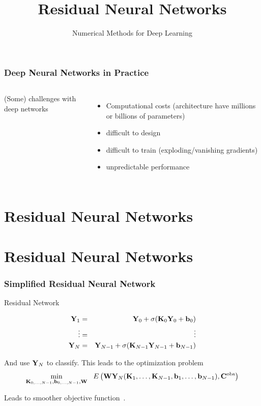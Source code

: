 \documentclass[12pt,fleqn,beamer]{beamer}
\date{}
\title[ResNet]{Residual Neural Networks}
\subtitle{Numerical Methods for Deep Learning}
\begin{document}
\makebeamertitle

\begin{frame}[fragile]\frametitle{Deep Neural Networks in Practice}

\begin{columns}
(Some) challenges with deep networks
\begin{itemize}
\item
Computational costs (architecture have millions or billions of parameters)
\item
difficult to design
\item
difficult to train (exploding/vanishing gradients)
\item
unpredictable performance
\end{itemize}

\bigskip
{}
	
\end{columns}


\end{frame}





\section{Residual Neural Networks} %
\label{sec:residual_neural_networks}

\section{Residual Neural Networks} %
\label{sec:residual_neural_networks}

\begin{frame}[fragile]\frametitle{Simplified Residual Neural Network}

Residual Network

\bigskip

\begin{eqnarray*}
{\bf Y}_1 &=& {\bf Y}_0 + \sigma({\bf K}_0{\bf Y}_0 + {\bf b}_0) \\
\vdots &=&  \vdots \\
 {\bf Y}_N &=& {\bf Y}_{N-1} + \sigma( {\bf K}_{N-1}{\bf Y}_{N-1} + {\bf b}_{N-1})
 \end{eqnarray*}

And use ${\bf Y}_N$ to classify. This leads to the optimization problem
$$ 
\min_{{\bf K}_{0,\ldots,N-1},{\bf b}_{0,\ldots,N-1},{\bf W}} \ \ E\left({\bf W}{\bf Y}_N({\bf K}_1,\ldots,{\bf K}_{N-1},{\bf b}_1,\ldots, {\bf b}_{N-1}), {\bf C}^{\rm obs} \right)
 $$

\bigskip
\begin{center}
	Leads to smoother objective function~\cite{LiEtAl2017}. 
	\end{center}

\end{frame}
\end{document}
